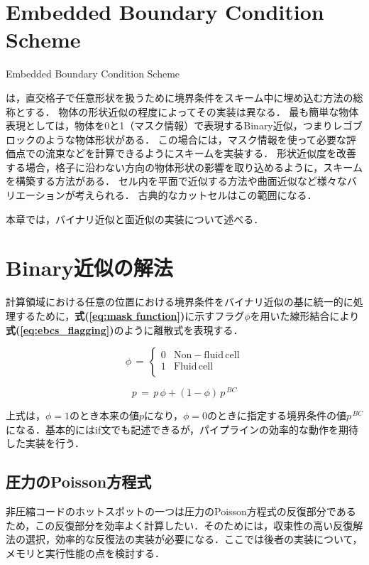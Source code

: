 \graphicspath{{./fig_EBCS/}}
%
\section{Embedded Boundary Condition Scheme}

\hypertarget{tgt:ebcs}{Embedded Boundary Condition Scheme}は，直交格子で任意形状を扱うために境界条件をスキーム中に埋め込む方法の総称とする．
物体の形状近似の程度によってその実装は異なる．
最も簡単な物体表現としては，物体を0と1（マスク情報）で表現するBinary近似，つまりレゴブロックのような物体形状がある．
この場合には，マスク情報を使って必要な評価点での流束などを計算できるようにスキームを実装する．
形状近似度を改善する場合，格子に沿わない方向の物体形状の影響を取り込めるように，スキームを構築する方法がある．
セル内を平面で近似する方法や曲面近似など様々なバリエーションが考えられる．
古典的なカットセルはこの範囲になる．

本章では，バイナリ近似と面近似の実装について述べる．

\section{Binary近似の解法}

計算領域における任意の位置における境界条件をバイナリ近似の基に統一的に処理するために，\textbf{式(\ref{eq:mask function})}に示すフラグ$\phi$を用いた線形結合により\textbf{式(\ref{eq:ebcs_flagging})}のように離散式を表現する．

\begin{equation}
\phi \,=\, \left\{
\begin{array}{ll}
0 & \mathrm{Non-fluid\, cell}\\
1 & \mathrm{Fluid\, cell}\\
\end{array} \right.
\label{eq:mask function}
\end{equation}

\begin{equation}
p \,=\, p\, \phi + (1-\phi)\, p^{\,BC}
\label{eq:ebcs_flagging}
\end{equation}

\noindent 上式は，$\phi=1$のとき本来の値$p$になり，$\phi=0$のときに指定する境界条件の値$p^{\,BC}$になる．基本的にはif文でも記述できるが，パイプラインの効率的な動作を期待した実装を行う．

%
\subsection{圧力のPoisson方程式}
非圧縮コードのホットスポットの一つは\hypertarget{tgt:Poisson Binary}{圧力のPoisson方程式}の反復部分であるため，この反復部分を効率よく計算したい．そのためには，収束性の高い反復解法の選択，効率的な反復法の実装が必要になる．ここでは後者の実装について，メモリと実行性能の点を検討する．


